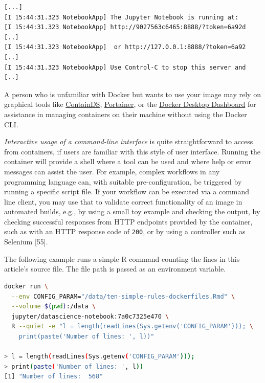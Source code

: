 \documentclass[10pt,letterpaper]{article}
\begin{document}
\begin{verbatim}
[...]
[I 15:44:31.323 NotebookApp] The Jupyter Notebook is running at:
[I 15:44:31.323 NotebookApp] http://9027563c6465:8888/?token=6a92d [..]
[I 15:44:31.323 NotebookApp]  or http://127.0.0.1:8888/?token=6a92 [..]
[I 15:44:31.323 NotebookApp] Use Control-C to stop this server and [..]
\end{verbatim}

\normalsize

A person who is unfamiliar with Docker but wants to use your image may
rely on graphical tools like \href{https://containds.com/}{ContainDS},
\href{https://www.portainer.io/}{Portainer}, or the
\href{https://docs.docker.com/desktop/dashboard/}{Docker Desktop
Dashboard} for assistance in managing containers on their machine
without using the Docker CLI.

\emph{Interactive usage of a command-line interface} is quite
straightforward to access from containers, if users are familiar with
this style of user interface. Running the container will provide a shell
where a tool can be used and where help or error messages can assist the
user. For example, complex workflows in any programming language can,
with suitable pre-configuration, be triggered by running a specific
script file. If your workflow can be executed via a command line client,
you may use that to validate correct functionality of an image in
automated builds, e.g., by using a small toy example and checking the
output, by checking successful responses from HTTP endpoints provided by
the container, such as with an HTTP response code of \texttt{200}, or by
using a controller such as Selenium {[}55{]}.

The following example runs a simple R command counting the lines in this
article's source file. The file path is passed as an environment
variable.

\footnotesize

\begin{minipage}{\linewidth}

\begin{lstlisting}[language=bash,caption={Passing a parameter via environment variable; working code in example `pass-parameter-env`, see \nameref{examples}.},breaklines=true,label={lst:passparam}]
docker run \
  --env CONFIG_PARAM="/data/ten-simple-rules-dockerfiles.Rmd" \
  --volume $(pwd):/data \
  jupyter/datascience-notebook:7a0c7325e470 \
  R --quiet -e "l = length(readLines(Sys.getenv('CONFIG_PARAM'))); \
    print(paste('Number of lines: ', l))"

> l = length(readLines(Sys.getenv('CONFIG_PARAM')));
> print(paste('Number of lines: ', l))
[1] "Number of lines:  568"

\end{lstlisting}

\end{minipage}
\end{document}
